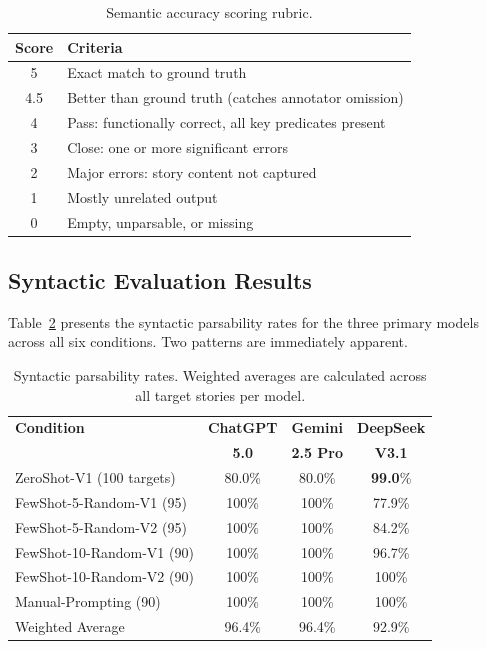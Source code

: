 \documentclass[runningheads]{llncs}
\begin{document}
\begin{table}[t]
\centering
\caption{Semantic accuracy scoring rubric.}
\label{tab:rubric}
\begin{tabular}{@{}cl@{}}
\toprule
\textbf{Score} & \textbf{Criteria} \\
\midrule
5   & Exact match to ground truth \\
4.5 & Better than ground truth (catches annotator omission) \\
4   & Pass: functionally correct, all key predicates present   \\
3   & Close: one or more significant errors \\
2   & Major errors: story content not captured \\
1   & Mostly unrelated output \\
0   & Empty, unparsable, or missing \\
\bottomrule
\end{tabular}
\end{table}

\subsection{Syntactic Evaluation Results}
\label{sec:syntactic-results}

Table~\ref{tab:syntactic} presents the syntactic parsability rates for the
three primary models across all six conditions.  Two patterns are
immediately apparent.

\begin{table}[t]
\centering
\small
\caption{Syntactic parsability rates.  Weighted averages are calculated across
all target stories per model.}
\label{tab:syntactic}
\begin{tabular}{@{}p{4.8cm}ccc@{}}
\toprule
\textbf{Condition}
 & \textbf{ChatGPT} & \textbf{Gemini} & \textbf{DeepSeek} \\
 & \textbf{5.0} & \textbf{2.5 Pro} & \textbf{V3.1} \\
\midrule
ZeroShot-V1 (100 targets)    & 80.0\% &  80.0\% & \textbf{99.0}\% \\
FewShot-5-Random-V1 (95)     & 100\%  & 100\%   &  77.9\% \\
FewShot-5-Random-V2 (95)     & 100\%  & 100\%   &  84.2\% \\
FewShot-10-Random-V1 (90)    & 100\%  & 100\%   &  96.7\% \\
FewShot-10-Random-V2 (90)    & 100\%  & 100\%   &  100\% \\
Manual-Prompting (90)         & 100\%  & 100\%   &  100\% \\
\midrule
Weighted Average              & 96.4\% & 96.4\%  & 92.9\% \\
\bottomrule
\end{tabular}
\end{table}
\end{document}
